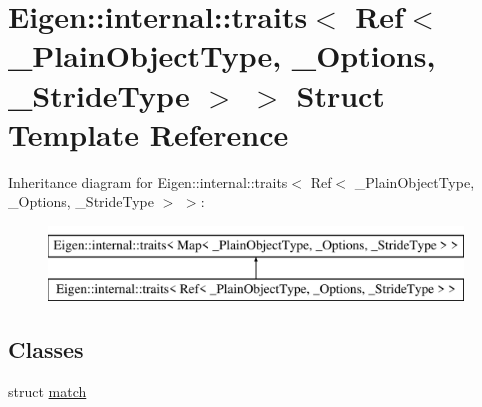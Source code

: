 \hypertarget{struct_eigen_1_1internal_1_1traits_3_01_ref_3_01___plain_object_type_00_01___options_00_01___stride_type_01_4_01_4}{}\section{Eigen\+::internal\+::traits$<$ Ref$<$ \+\_\+\+Plain\+Object\+Type, \+\_\+\+Options, \+\_\+\+Stride\+Type $>$ $>$ Struct Template Reference}
\label{struct_eigen_1_1internal_1_1traits_3_01_ref_3_01___plain_object_type_00_01___options_00_01___stride_type_01_4_01_4}
Inheritance diagram for Eigen\+::internal\+::traits$<$ Ref$<$ \+\_\+\+Plain\+Object\+Type, \+\_\+\+Options, \+\_\+\+Stride\+Type $>$ $>$\+:\begin{figure}[H]
\begin{center}
\leavevmode
\includegraphics[height=2.000000cm]{struct_eigen_1_1internal_1_1traits_3_01_ref_3_01___plain_object_type_00_01___options_00_01___stride_type_01_4_01_4}
\end{center}
\end{figure}
\subsection*{Classes}
\begin{DoxyCompactItemize}
\item 
struct \mbox{\hyperlink{struct_eigen_1_1internal_1_1traits_3_01_ref_3_01___plain_object_type_00_01___options_00_01___stride_type_01_4_01_4_1_1match}{match}}
\end{DoxyCompactItemize}
